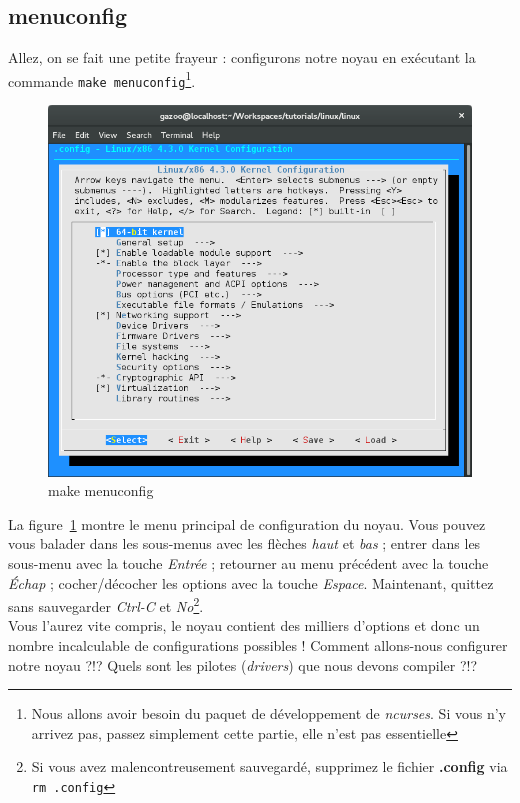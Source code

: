 \documentclass[a4paper]{article}
\begin{document}
\subsection{menuconfig}

Allez, on se fait une petite frayeur : configurons notre noyau en exécutant la commande \lstinline{make menuconfig}\footnote{Nous allons avoir besoin du paquet de développement de \textit{ncurses}. Si vous n'y arrivez pas, passez simplement cette partie, elle n'est pas essentielle}.\\

\begin{figure}
\label{fig:make_menuconfig}
\includegraphics[scale=0.5]{../res/make-menuconfig.png}
\caption{make menuconfig}
\end{figure}

La figure~\ref{fig:make_menuconfig} montre le menu principal de configuration du noyau. Vous pouvez vous balader dans les sous-menus avec les flèches \textit{haut} et \textit{bas} ; entrer dans les sous-menu avec la touche \textit{Entrée} ; retourner au menu précédent avec la touche \textit{Échap} ; cocher/décocher les options avec la touche \textit{Espace}. Maintenant, quittez sans sauvegarder \textit{Ctrl-C} et \textit{No}\footnote{Si vous avez malencontreusement sauvegardé, supprimez le fichier \textbf{.config} via \lstset{language=sh}\lstinline{rm .config}}.\\

Vous l'aurez vite compris, le noyau contient des milliers d'options et donc un nombre incalculable de configurations possibles ! Comment allons-nous configurer notre noyau ?!? Quels sont les pilotes (\textit{drivers}) que nous devons compiler ?!?
\end{document}
